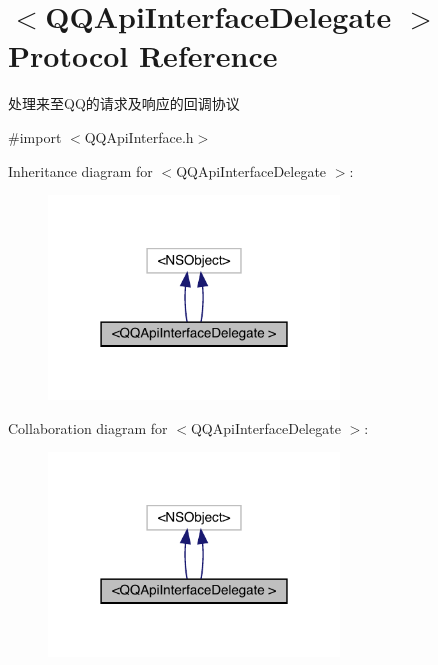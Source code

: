 \hypertarget{protocol_q_q_api_interface_delegate_01-p}{}\section{$<$Q\+Q\+Api\+Interface\+Delegate $>$ Protocol Reference}
\label{protocol_q_q_api_interface_delegate_01-p}


处理来至\+Q\+Q的请求及响应的回调协议  




{\ttfamily \#import $<$Q\+Q\+Api\+Interface.\+h$>$}



Inheritance diagram for $<$Q\+Q\+Api\+Interface\+Delegate $>$\+:\nopagebreak
\begin{figure}[H]
\begin{center}
\leavevmode
\includegraphics[width=219pt]{protocol_q_q_api_interface_delegate_01-p__inherit__graph}
\end{center}
\end{figure}


Collaboration diagram for $<$Q\+Q\+Api\+Interface\+Delegate $>$\+:\nopagebreak
\begin{figure}[H]
\begin{center}
\leavevmode
\includegraphics[width=219pt]{protocol_q_q_api_interface_delegate_01-p__coll__graph}
\end{center}
\end{figure}
